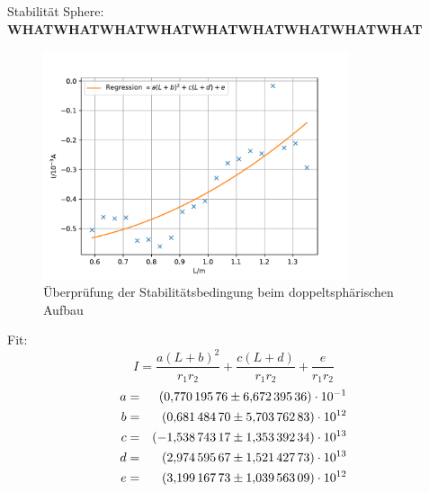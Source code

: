Stabilität Sphere:
\textbf{WHATWHATWHATWHATWHATWHATWHATWHATWHAT}
\begin{figure}
  \centering
  \includegraphics[width=0.8\textwidth]{stabsphere.pdf}
  \caption{Überprüfung der Stabilitätsbedingung beim doppeltsphärischen Aufbau}
  \label{fig:stabsphere}
\end{figure}
Fit:
\begin{equation*}
  I= \frac{a(L+b)^2}{r_1 r_2}+\frac{c(L+d)}{r_1 r_2}+\frac{e}{r_1 r_2}
\end{equation*}
\FloatBarrier
\begin{align*}
a &=& \SI{0.77019576  \pm 6.67239536e-01}{} \\
b &=& \SI{0.68148470  \pm 5.70376283e+12}{} \\
c &=& \SI{-1.53874317 \pm 1.35339234e+13}{} \\
d &=& \SI{2.97459567  \pm 1.52142773e+13}{} \\
e &=& \SI{3.19916773  \pm 1.03956309e+12}{} \\
\end{align*}
\FloatBarrier

